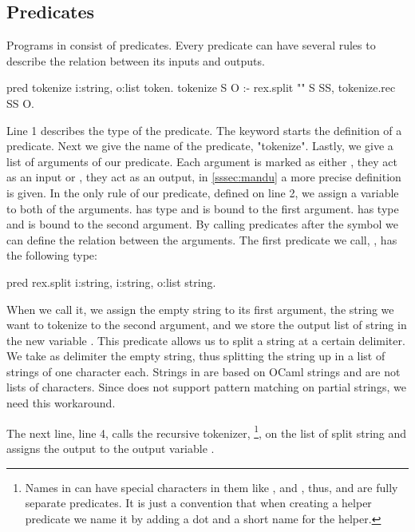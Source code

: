 \documentclass[thesis.tex]{subfiles}
\begin{document}
{{\subsection{Predicates} \label{sssec:predicates}
Programs in \elpi consist of predicates. Every predicate can have several rules to describe the relation between its inputs and outputs.
\begin{elpicode}
  pred tokenize i:string, o:list token.
  tokenize S O :- 
    rex.split "" S SS,
    tokenize.rec SS O.
\end{elpicode}
Line 1 describes the type of the predicate. The keyword  starts the definition of a predicate. Next we give the name of the predicate, "tokenize". Lastly, we give a list of arguments of our predicate. Each argument is marked as either , they act as an input or , they act as an output, in \cref*{sssec:mandu} a more precise definition is given. In the only rule of our predicate, defined on line 2, we assign a variable to both of the arguments.  has type  and is bound to the first argument.  has type  and is bound to the second argument. By calling predicates after the \elpii{:-} symbol we can define the relation between the arguments. The first predicate we call, , has the following type:
\begin{elpicode}
  pred rex.split i:string, i:string, o:list string.
\end{elpicode}
When we call it, we assign the empty string to its first argument, the string we want to tokenize to the second argument, and we store the output list of string in the new variable . This predicate allows us to split a string at a certain delimiter. We take as delimiter the empty string, thus splitting the string up in a list of strings of one character each. Strings in \elpi are based on OCaml strings and are not lists of characters. Since \elpi does not support pattern matching on partial strings, we need this workaround.

The next line, line 4, calls the recursive tokenizer, \footnote{Names in \elpi can have special characters in them like , \elpii{-} and \elpii{>}, thus,  and  are fully separate predicates. It is just a convention that when creating a helper predicate we name it by adding a dot and a short name for the helper.}, on the list of split string and assigns the output to the output variable .

}}
\end{document}
